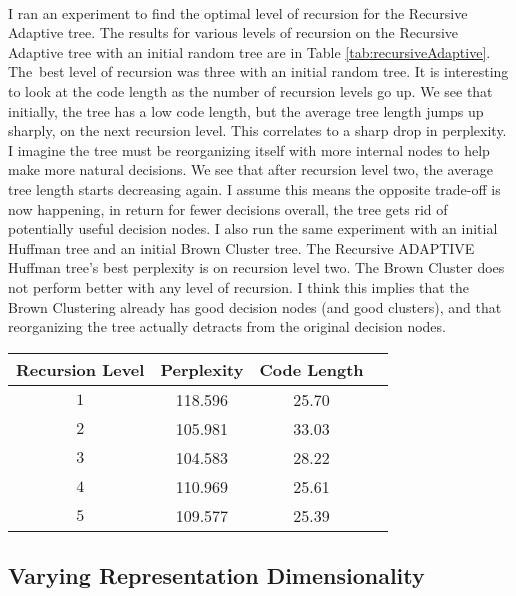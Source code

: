 \paragraph{}
I ran an experiment to find the optimal level of recursion for the Recursive Adaptive tree. The results for various levels of recursion on the Recursive Adaptive tree with an initial random tree are in Table \ref{tab:recursiveAdaptive}. The~best level of recursion was three with an initial random tree. It is interesting to look at the code length as the number of recursion levels go up. We see that initially, the tree has a low code length, but the average tree length jumps up sharply, on the next recursion level. This correlates to a sharp drop in perplexity. I imagine the tree must be reorganizing itself with more internal nodes to help make more natural decisions. We see that after recursion level two, the average tree length starts decreasing again. I assume this means the opposite trade-off is now happening, in return for fewer decisions overall, the tree gets rid of potentially useful decision nodes. I also run the same experiment with an initial Huffman tree and an initial Brown Cluster tree. The Recursive ADAPTIVE Huffman tree's best perplexity is on recursion level two. The Brown Cluster does not perform better with any level of recursion. I think this implies that the Brown Clustering already has good decision nodes (and good clusters), and that reorganizing the tree actually detracts from the original decision nodes.
\begin{table*} \centering
{}
\begin{tabular}{@{}cccc@{}}\toprule
Recursion Level & Perplexity & Code Length\\ 
\midrule
$1$ & 118.596 & 25.70\\
$2$ & 105.981 & 33.03\\
$3$ & 104.583 & 28.22\\
$4$ & 110.969 & 25.61\\
$5$ & 109.577 & 25.39\\
\bottomrule
\end{tabular}
\caption{The effect of more recursion levels on the Recursive ADAPTIVE tree with an initial random tree}
\label{tab:recursiveAdaptive}
\end{table*}

\subsection{Varying Representation Dimensionality}
